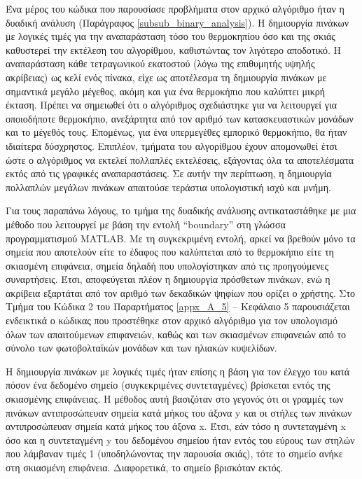 \documentclass[12pt, a4paper]{report} %
\newcommand{\english}{\foreignlanguage{english}}
\begin{document}
Ένα μέρος του κώδικα που παρουσίασε προβλήματα στον αρχικό αλγόριθμο ήταν η δυαδική ανάλυση (Παράγραφος \ref*{subsub_binary_analysis}). 
Η δημιουργία πινάκων με λογικές τιμές για την αναπαράσταση τόσο του θερμοκηπίου όσο και της σκιάς καθυστερεί την εκτέλεση του 
αλγορίθμου, καθιστώντας τον λιγότερο αποδοτικό. Η αναπαράσταση κάθε τετραγωνικού εκατοστού (λόγω της επιθυμητής υψηλής ακρίβειας) 
ως κελί ενός πίνακα, είχε ως αποτέλεσμα τη δημιουργία πινάκων με σημαντικά μεγάλο μέγεθος, ακόμη και για ένα θερμοκήπιο που 
καλύπτει μικρή έκταση. Πρέπει να σημειωθεί ότι ο αλγόριθμος σχεδιάστηκε για να λειτουργεί για οποιοδήποτε θερμοκήπιο, ανεξάρτητα 
από τον αριθμό των κατασκευαστικών μονάδων και το μέγεθός τους. Επομένως, για ένα υπερμεγέθες εμπορικό θερμοκήπιο, θα ήταν ιδιαίτερα 
δύσχρηστος. Επιπλέον, τμήματα του αλγορίθμου έχουν απομονωθεί έτσι ώστε ο αλγόριθμος να εκτελεί πολλαπλές εκτελέσεις, εξάγοντας 
όλα τα αποτελέσματα εκτός από τις γραφικές αναπαραστάσεις. Σε αυτήν την περίπτωση, η δημιουργία πολλαπλών μεγάλων πινάκων απαιτούσε 
τεράστια υπολογιστική ισχύ και μνήμη.

Για τους παραπάνω λόγους, το τμήμα της δυαδικής ανάλυσης αντικαταστάθηκε με μια μέθοδο που λειτουργεί με βάση την εντολή 
\english{“boundary”} στη γλώσσα προγραμματισμού \english{MATLAB}. Με τη συγκεκριμένη εντολή, αρκεί να βρεθούν μόνο τα σημεία που 
αποτελούν είτε το έδαφος που καλύπτεται από το θερμοκήπιο είτε τη σκιασμένη επιφάνεια, σημεία δηλαδή που υπολογίστηκαν από τις 
προηγούμενες συναρτήσεις. Έτσι, αποφεύγεται πλέον η δημιουργία πρόσθετων πινάκων, ενώ η ακρίβεια εξαρτάται από τον αριθμό των 
δεκαδικών ψηφίων που ορίζει ο χρήστης. Στο Τμήμα του Κώδικα 2 του Παραρτήματος \ref{appx_A_5} – Κεφάλαιο 5 παρουσιάζεται 
ενδεικτικά ο κώδικας που προστέθηκε στον αρχικό αλγόριθμο για τον υπολογισμό όλων των απαιτούμενων επιφανειών, καθώς και των 
σκιασμένων επιφανειών από το σύνολο των φωτοβολταϊκών μονάδων και των ηλιακών κυψελίδων.

Η δημιουργία πινάκων με λογικές τιμές ήταν επίσης η βάση για τον έλεγχο του κατά πόσον ένα δεδομένο σημείο (συγκεκριμένες 
συντεταγμένες) βρίσκεται εντός της σκιασμένης επιφάνειας. Η μέθοδος αυτή βασιζόταν στο γεγονός ότι οι γραμμές των πινάκων 
αντιπροσώπευαν σημεία κατά μήκος του άξονα \english{y} και οι στήλες των πινάκων αντιπροσώπευαν σημεία κατά μήκος του άξονα \english{x}. 
Έτσι, εάν τόσο η συντεταγμένη \english{x} όσο και η συντεταγμένη \english{y} του δεδομένου σημείου ήταν εντός του εύρους των στηλών 
που λάμβαναν τιμές 1 (υποδηλώνοντας την παρουσία σκιάς), τότε το σημείο ανήκε στη σκιασμένη επιφάνεια. Διαφορετικά, το σημείο 
βρισκόταν εκτός.
\end{document}

